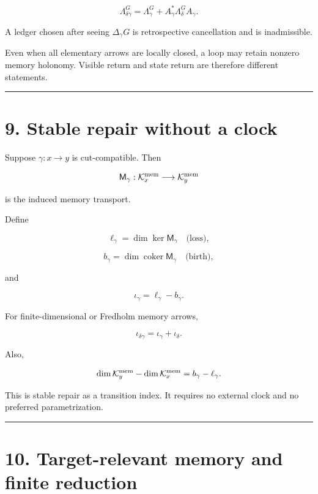 \[
\boxed{
\Lambda_{\delta\gamma}^G
=\Lambda_\gamma^G
+A_\gamma^*\Lambda_\delta^G A_\gamma.
}
\]

A ledger chosen after seeing \(\Delta_\gamma G\) is retrospective cancellation
and is inadmissible.

Even when all elementary arrows are locally closed, a loop may retain nonzero
memory holonomy. Visible return and state return are therefore different
statements.

\begin{center}\rule{0.5\linewidth}{0.5pt}\end{center}

\hypertarget{stable-repair-without-a-clock}{%
\section{9. Stable repair without a clock}\label{stable-repair-without-a-clock}}

Suppose \(\gamma:x\to y\) is cut-compatible. Then

\[
\mathsf M_\gamma:
\mathcal K_x^{\rm mem}
\longrightarrow
\mathcal K_y^{\rm mem}
\]

is the induced memory transport.

Define

\[
\ell_\gamma=\dim\ker\mathsf M_\gamma
\quad\text{(loss)},
\]

\[
b_\gamma=\dim\operatorname{coker}\mathsf M_\gamma
\quad\text{(birth)},
\]

and

\[
\iota_\gamma=\ell_\gamma-b_\gamma.
\]

For finite-dimensional or Fredholm memory arrows,

\[
\boxed{
\iota_{\delta\gamma}
=\iota_\gamma+\iota_\delta.
}
\]

Also,

\[
\dim\mathcal K_y^{\rm mem}
-
\dim\mathcal K_x^{\rm mem}
=b_\gamma-\ell_\gamma.
\]

This is stable repair as a transition index. It requires no external clock and
no preferred parametrization.

\begin{center}\rule{0.5\linewidth}{0.5pt}\end{center}

\hypertarget{target-relevant-memory-and-finite-reduction}{%
\section{10. Target-relevant memory and finite reduction}\label{target-relevant-memory-and-finite-reduction}}

